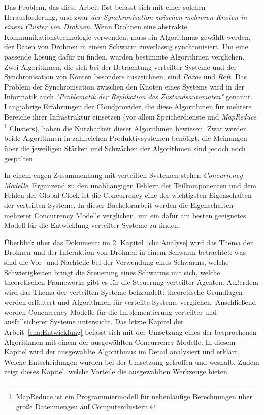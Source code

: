 Das Problem, das diese Arbeit löst befasst sich mit einer solchen Herausforderung, und zwar \textit{der Synchronisation zwischen mehreren Knoten in einem Cluster von Drohnen}. Wenn Drohnen eine abstrakte Kommunikationstechnologie verwenden, muss ein Algorithmus gewählt werden, der Daten von Drohnen in einem Schwarm zuverlässig synchronisiert. Um eine passende Lösung dafür zu finden, wurden bestimmte Algorithmen verglichen. Zwei Algorithmen, die sich bei der Betrachtung verteilter Systeme und der Synchronisation von Konten besonders auszeichnen, sind \textit{Paxos} und \textit{Raft}. Das Problem der Synchronisation zwischen den Knoten eines Systems wird in der Informatik auch \textit{"Problematik der Replikation des Zustandsautomaten"} genannt. Langjährige Erfahrungen der Cloudprovider, die diese Algorithmen für mehrere Bereiche ihrer Infrastruktur einsetzen (vor allem Speicherdienste und \textit{MapReduce} \footnote{MapReduce ist ein Programmiermodell für nebenläufige Berechnungen über große Datenmengen auf Computerclustern.} Clusters), haben die Nutzbarkeit dieser Algorithmen bewiesen. Zwar werden beide Algorithmen in zahlreichen Produktivsystemen benötigt, die Meinungen über die jeweiligen Stärken und Schwächen der Algorithmen sind jedoch noch gespalten.

In einem engen Zusammenhang mit verteilten Systemen stehen \textit{Concurrency Modelle}. Ergänzend zu den unabhängigen Fehlern der Teilkomponenten und dem Fehlen der Global Clock ist die Concurrency eine der wichtigsten Eigenschaften der verteilten Systeme. In dieser Bachelorarbeit werden die Eigenschaften mehrerer Concurrency Modelle verglichen, um ein dafür am besten geeignetes Modell für die Entwicklung verteilter Systeme zu finden.

Überblick über das Dokument: im 2. Kapitel~\ref{cha:Analyse} wird das Thema der Drohnen und der Interaktion von Drohnen in einem Schwarm betrachtet: was sind die Vor- und Nachteile bei der Verwendung eines Schwarms, welche Schwierigkeiten bringt die Steuerung eines Schwarms mit sich, welche theoretischen Frameworks gibt es für die Steuerung verteilter Agenten. Außerdem wird das Thema der verteilten Systeme behzandelt: theoretische Grundlagen werden erläutert und Algorithmen für verteilte Systeme verglichen. Anschließend werden Concurrency Modelle für die Implementierung verteilter und ausfallsicherer Systeme untersucht. Das letzte Kapitel der Arbeit~\ref{cha:Entwicklung} befasst sich mit der Umsetzung eines der besprochenen Algorithmen mit einem der ausgewählten Concurrency Modelle. In diesem Kapitel wird der ausgewählte Algorithmus im Detail analysiert und erklärt. Welche Entscheidungen wurden bei der Umsetzung getroffen und weshalb. Zudem zeigt dieses Kapitel, welche Vorteile die ausgewählten Werkzeuge bieten.
